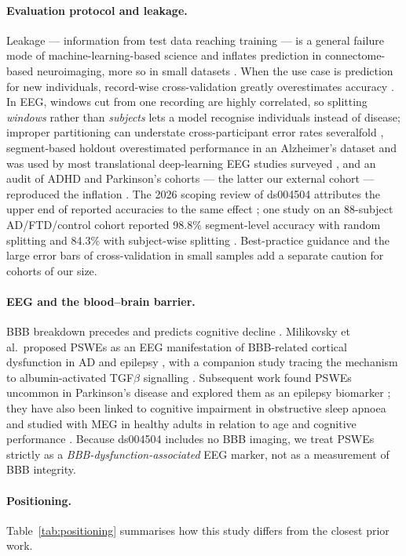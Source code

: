 \paragraph{Evaluation protocol and leakage.}
Leakage --- information from test data reaching training --- is a general failure mode of
machine-learning-based science \cite{F8} and inflates prediction in connectome-based neuroimaging, more so in
small datasets \cite{L5}. When the use case is prediction for new individuals, record-wise cross-validation
greatly overestimates accuracy \cite{L1}. In EEG, windows cut from one recording are highly correlated, so
splitting \emph{windows} rather than \emph{subjects} lets a model recognise individuals instead of disease;
improper partitioning can understate cross-participant error rates severalfold \cite{L4}, segment-based holdout
overestimated performance in an Alzheimer's dataset and was used by most translational deep-learning EEG studies
surveyed \cite{L2}, and an audit of ADHD and Parkinson's cohorts --- the latter our external cohort ---
reproduced the inflation \cite{L3}. The 2026 scoping review of ds004504 attributes the upper end of reported
accuracies to the same effect \cite{R1}; one study on an 88-subject AD/FTD/control cohort reported 98.8\%
segment-level accuracy with random splitting and 84.3\% with subject-wise splitting \cite{R2}. Best-practice
guidance \cite{L7} and the large error bars of cross-validation in small samples \cite{L6} add a separate
caution for cohorts of our size.

\paragraph{EEG and the blood--brain barrier.}
BBB breakdown precedes and predicts cognitive decline \cite{B5,B8}. Milikovsky et al.\ proposed
PSWEs as an EEG manifestation of BBB-related cortical dysfunction in AD and epilepsy \cite{B1}, with
a companion study tracing the mechanism to albumin-activated TGF$\beta$ signalling \cite{B2}.
Subsequent work found PSWEs uncommon in Parkinson's disease \cite{B3} and explored them as an
epilepsy biomarker \cite{B4}; they have also been linked to cognitive impairment in obstructive sleep
apnoea \cite{pswe_osa} and studied with MEG in healthy adults in relation to age and cognitive performance
\cite{pswe_healthy}. Because ds004504 includes no BBB imaging, we treat PSWEs strictly as a
\emph{BBB-dysfunction-associated} EEG marker, not as a measurement of BBB integrity.

\paragraph{Positioning.}
Table~\ref{tab:positioning} summarises how this study differs from the closest prior work.

